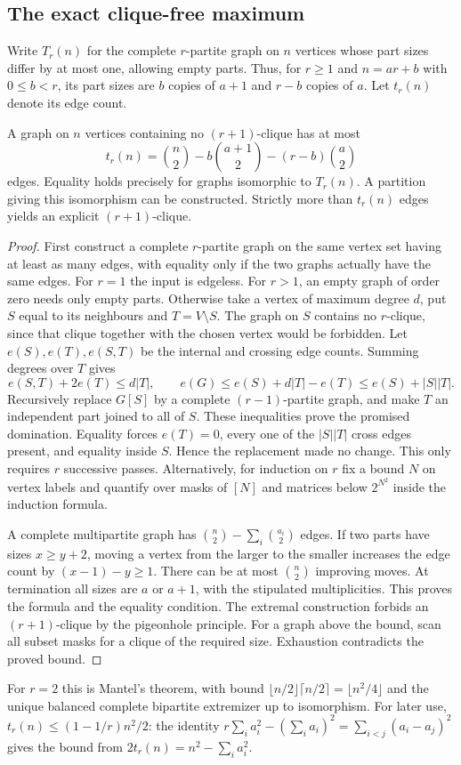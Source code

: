\subsection{The exact clique-free maximum}
Write $T_r(n)$ for the complete $r$-partite graph on $n$ vertices whose
part sizes differ by at most one, allowing empty parts. Thus, for $r\ge1$
and $n=ar+b$ with $0\le b<r$, its part sizes are $b$ copies of $a+1$ and
$r-b$ copies of $a$. Let $t_r(n)$ denote its edge count.
\begin{theorem}\leavevmode\label{co:turan}
A graph on $n$ vertices containing no $(r+1)$-clique has at most
\[
 t_r(n)=\binom n2-b\binom{a+1}2-(r-b)\binom a2
\]
edges. Equality holds precisely for graphs isomorphic to $T_r(n)$. A
partition giving this isomorphism can be constructed. Strictly more than
$t_r(n)$ edges yields an explicit $(r+1)$-clique.
\end{theorem}
\begin{proof}
First construct a complete $r$-partite graph on the same vertex set having
at least as many edges, with equality only if the two graphs actually have
the same edges. For $r=1$ the input is edgeless. For $r>1$, an empty graph
of order zero needs only empty parts. Otherwise take a vertex of maximum
degree $d$, put $S$ equal to its neighbours and $T=V\setminus S$.
The graph on $S$ contains no $r$-clique, since that clique together with the
chosen vertex would be forbidden. Let $e(S),e(T),e(S,T)$ be the internal and
crossing edge counts. Summing degrees over $T$ gives
\[
 e(S,T)+2e(T)\le d|T|,\qquad
 e(G)\le e(S)+d|T|-e(T)\le e(S)+|S||T|.
\]
Recursively replace $G[S]$ by a complete $(r-1)$-partite graph, and
make $T$ an independent part joined to all of $S$. These inequalities prove
the promised domination. Equality forces $e(T)=0$, every one of the
$|S||T|$ cross edges present, and equality inside $S$. Hence the
replacement made no change. This only requires $r$ successive passes.
Alternatively, for induction on $r$ fix a bound $N$ on vertex labels
and quantify over masks of $[N]$ and matrices below $2^{N^2}$ inside
the induction formula.

A complete multipartite graph has $\binom n2-\sum_i\binom{a_i}2$ edges.
If two parts have sizes $x\ge y+2$, moving a vertex from the larger to the
smaller increases the edge count by $(x-1)-y\ge1$. There can be at most
$\binom n2$ improving moves. At termination all sizes are $a$ or $a+1$,
with the stipulated multiplicities. This proves the formula and the equality
condition. The extremal construction forbids an $(r+1)$-clique by the
pigeonhole principle. For a graph above the bound, scan all subset masks
for a clique of the required size. Exhaustion contradicts the proved bound.
\end{proof}
For $r=2$ this is Mantel's theorem, with bound
$\lfloor n/2\rfloor\lceil n/2\rceil=\lfloor n^2/4\rfloor$ and the unique
balanced complete bipartite extremizer up to isomorphism.
For later use,
$t_r(n)\le (1-1/r)n^2/2$: the identity
$r\sum_i a_i^2-(\sum_i a_i)^2=\sum_{i<j}(a_i-a_j)^2$
gives the bound from $2t_r(n)=n^2-\sum_i a_i^2$.

